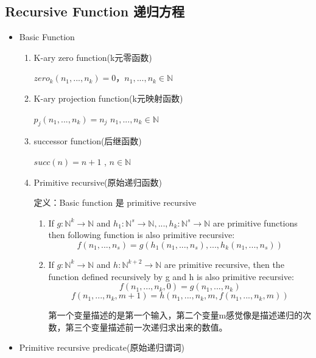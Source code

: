 \documentclass[UTF8]{ctexart}
\begin{document}
\subsection{Recursive Function 递归方程}
\begin{itemize}
    \item Basic Function
    \begin{enumerate}
        \item K-ary zero function(k元零函数)
        
        \(zero_{k}(n_{1}, ..., n_{k})=0\)，\(n_{1}, ..., n_{k} \in \mathbb{N}\)

        \item K-ary projection function(k元映射函数)
        
        \(p_{j}(n_{1}, ..., n_{k})=n_{j}\) \(n_{1}, ..., n_{k} \in \mathbb{N}\)

        \item successor function(后继函数)
        
        \(succ(n)=n+1\) , \(n \in \mathbb{N}\)

        \item Primitive recursive(原始递归函数)
        
        定义：Basic function 是 primitive recursive 

        \begin{enumerate}
            \item If \(g: \mathbb{N}^{k} \to \mathbb{N}\) and \(h_{1}: \mathbb{N}^{s} \to \mathbb{N}, ..., h_{k}: \mathbb{N}^{s} \to \mathbb{N}\) are primitive functions then following function is also primitive recursive: \[f\left(n_{1}, ..., n_{s}\right)=g\left(h_{1}\left(n_{1}, ..., n_{s}\right), ..., h_{k}\left(n_{1}, ..., n_{s}\right)\right)\]
            \item If \(g: \mathbb{N}^{k} \to \mathbb{N}\) and \(h: \mathbb{N}^{k+2} \to \mathbb{N}\) are primitive recursive, then the function defined recursively by g and h is also primitive recursive: \[f\left(n_{1}, ..., n_{k}, 0\right)=g\left(n_{1}, ..., n_{k}\right)\] \[f\left(n_{1}, ..., n_{k}, m+1\right)=h\left(n_{1}, ..., n_{k}, m, f\left(n_{1}, ..., n_{k}, m\right)\right)\]
            
            第一个变量描述的是第一个输入，第二个变量m感觉像是描述递归的次数，第三个变量描述前一次递归求出来的数值。
            
        \end{enumerate}


    \end{enumerate}
    \item Primitive recursive predicate(原始递归谓词)
    

\end{itemize}
\end{document}
